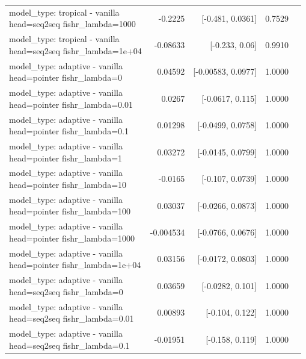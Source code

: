 \documentclass[10pt]{article}
\makeatletter
\newcommand{\stackcell}[1]{\begin{tabular}[t]{@{}l@{}}#1\end{tabular}}
\makeatother
\begin{document}
{\begin{longtable}{lrrrl}
\stackcell{model\_type: tropical - vanilla\\\footnotesize head=seq2seq fishr\_lambda=1000 } & -0.2225 & [-0.481, 0.0361] & 0.7529 & \\
\stackcell{model\_type: tropical - vanilla\\\footnotesize head=seq2seq fishr\_lambda=1e+04 } & -0.08633 & [-0.233, 0.06] & 0.9910 & \\
\stackcell{model\_type: adaptive - vanilla\\\footnotesize head=pointer fishr\_lambda=0 } & 0.04592 & [-0.00583, 0.0977] & 1.0000 & \\
\stackcell{model\_type: adaptive - vanilla\\\footnotesize head=pointer fishr\_lambda=0.01 } & 0.0267 & [-0.0617, 0.115] & 1.0000 & \\
\stackcell{model\_type: adaptive - vanilla\\\footnotesize head=pointer fishr\_lambda=0.1 } & 0.01298 & [-0.0499, 0.0758] & 1.0000 & \\
\stackcell{model\_type: adaptive - vanilla\\\footnotesize head=pointer fishr\_lambda=1 } & 0.03272 & [-0.0145, 0.0799] & 1.0000 & \\
\stackcell{model\_type: adaptive - vanilla\\\footnotesize head=pointer fishr\_lambda=10 } & -0.0165 & [-0.107, 0.0739] & 1.0000 & \\
\stackcell{model\_type: adaptive - vanilla\\\footnotesize head=pointer fishr\_lambda=100 } & 0.03037 & [-0.0266, 0.0873] & 1.0000 & \\
\stackcell{model\_type: adaptive - vanilla\\\footnotesize head=pointer fishr\_lambda=1000 } & -0.004534 & [-0.0766, 0.0676] & 1.0000 & \\
\stackcell{model\_type: adaptive - vanilla\\\footnotesize head=pointer fishr\_lambda=1e+04 } & 0.03156 & [-0.0172, 0.0803] & 1.0000 & \\
\stackcell{model\_type: adaptive - vanilla\\\footnotesize head=seq2seq fishr\_lambda=0 } & 0.03659 & [-0.0282, 0.101] & 1.0000 & \\
\stackcell{model\_type: adaptive - vanilla\\\footnotesize head=seq2seq fishr\_lambda=0.01 } & 0.00893 & [-0.104, 0.122] & 1.0000 & \\
\stackcell{model\_type: adaptive - vanilla\\\footnotesize head=seq2seq fishr\_lambda=0.1 } & -0.01951 & [-0.158, 0.119] & 1.0000 & \\

\end{longtable}}
\end{document}
